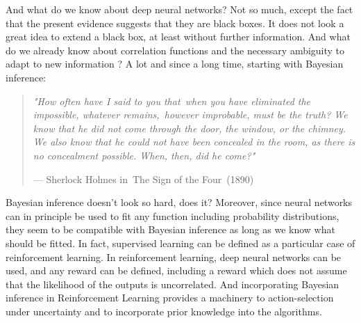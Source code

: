 \documentclass[11pt]{book}
\begin{document}
And what do we know about deep neural networks? Not so much, except the
fact that the present evidence suggests that they are black
boxes\cite{lakshminarayanan_simple_2017}\cite{egele_autodeuq_2022}. It does not look a great idea to extend a black box, at least
without further information. And what do we already know about
correlation functions and the necessary ambiguity to adapt to new
information ? A lot and since a long time, starting with Bayesian
inference:

\begin{quote}
\emph{"How often have I said to you that~when you have eliminated the
impossible, whatever remains,~however improbable, must be the truth? We
know that he did not come through the door, the window, or the chimney.
We also know that he could not have been concealed in the room, as there
is no concealment possible. When, then, did he come?"}

--- Sherlock Holmes in~The Sign of the Four~(1890)
\end{quote}

Bayesian inference doesn't look so hard, does it? Moreover, since neural
networks can in principle be used to fit any function including
probability distributions, they seem to be compatible with Bayesian
inference as long as we know what should be fitted. In fact, supervised
learning can be defined as a particular case of reinforcement
learning\cite{barto_reinforcement_2004}. In reinforcement learning, deep neural networks can
be used, and any reward can be defined, including a reward which does
not assume that the likelihood of the outputs is uncorrelated. And
incorporating Bayesian inference in Reinforcement Learning provides a
machinery to action-selection under uncertainty and to incorporate prior
knowledge into the
algorithms\cite{ghavamzadeh_bayesian_2015}.
\end{document}
